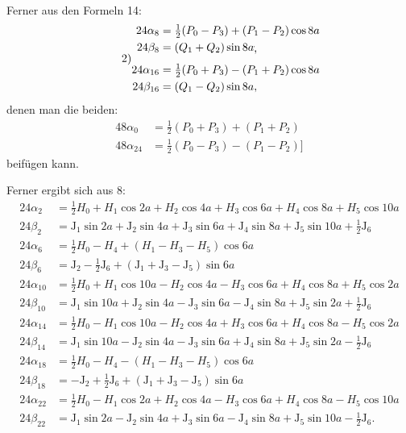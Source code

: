 \begin{landscape}
\[\begin{aligned}
\end{aligned}
\]
\par\noindent\hspace*{\parindent}Ferner aus den Formeln 14:
\[
\tag*{2)}
\begin{aligned}
24\alpha_8&=\tfrac12(P_0-P_3)+(P_1-P_2)\cos8a\\
24\beta_8&=(Q_1+Q_2)\sin8a\VthreeTerminalPair\\[4pt]
24\alpha_{16}&=\tfrac12(P_0+P_3)-(P_1+P_2)\cos8a\\
24\beta_{16}&=(Q_1-Q_2)\sin8a,
\end{aligned}
\]
denen man die beiden:
\[
\begin{aligned}
48\alpha_0&=\tfrac12(P_0+P_3)+(P_1+P_2)\\
48\alpha_{24}&=\tfrac12(P_0-P_3)-(P_1-P_2)]
\end{aligned}
\]
beifügen kann.
\par\noindent\hspace*{\parindent}Ferner ergibt sich aus 8:
\[
\tag*{3)}
\begin{aligned}
24\alpha_2&=\tfrac12 H_0+H_1\cos2a+H_2\cos4a+H_3\cos6a+H_4\cos8a+H_5\cos10a\\
24\beta_2&=\mathrm{J}_1\sin2a+\mathrm{J}_2\sin4a+\mathrm{J}_3\sin6a+\mathrm{J}_4\sin8a+\mathrm{J}_5\sin10a+\tfrac12\mathrm{J}_6\\[4pt]
24\alpha_6&=\tfrac12 H_0-H_4+(H_1-H_3-H_5)\cos6a\\
24\beta_6&=\mathrm{J}_2-\tfrac12\mathrm{J}_6+(\mathrm{J}_1+\mathrm{J}_3-\mathrm{J}_5)\sin6a\\[4pt]
24\alpha_{10}&=\tfrac12 H_0+H_1\cos10a-H_2\cos4a-H_3\cos6a+H_4\cos8a+H_5\cos2a\\
24\beta_{10}&=\mathrm{J}_1\sin10a+\mathrm{J}_2\sin4a-\mathrm{J}_3\sin6a-\mathrm{J}_4\sin8a+\mathrm{J}_5\sin2a+\tfrac12\mathrm{J}_6\\[4pt]
24\alpha_{14}&=\tfrac12 H_0-H_1\cos10a-H_2\cos4a+H_3\cos6a+H_4\cos8a-H_5\cos2a\\
24\beta_{14}&=\mathrm{J}_1\sin10a-\mathrm{J}_2\sin4a-\mathrm{J}_3\sin6a+\mathrm{J}_4\sin8a+\mathrm{J}_5\sin2a-\tfrac12\mathrm{J}_6\\[4pt]
24\alpha_{18}&=\tfrac12 H_0-H_4-(H_1-H_3-H_5)\cos6a\\
24\beta_{18}&=-\mathrm{J}_2+\tfrac12\mathrm{J}_6+(\mathrm{J}_1+\mathrm{J}_3-\mathrm{J}_5)\sin6a\\[4pt]
24\alpha_{22}&=\tfrac12 H_0-H_1\cos2a+H_2\cos4a-H_3\cos6a+H_4\cos8a-H_5\cos10a\\
24\beta_{22}&=\mathrm{J}_1\sin2a-\mathrm{J}_2\sin4a+\mathrm{J}_3\sin6a-\mathrm{J}_4\sin8a+\mathrm{J}_5\sin10a-\tfrac12\mathrm{J}_6.

\end{aligned}\]
\end{landscape}
